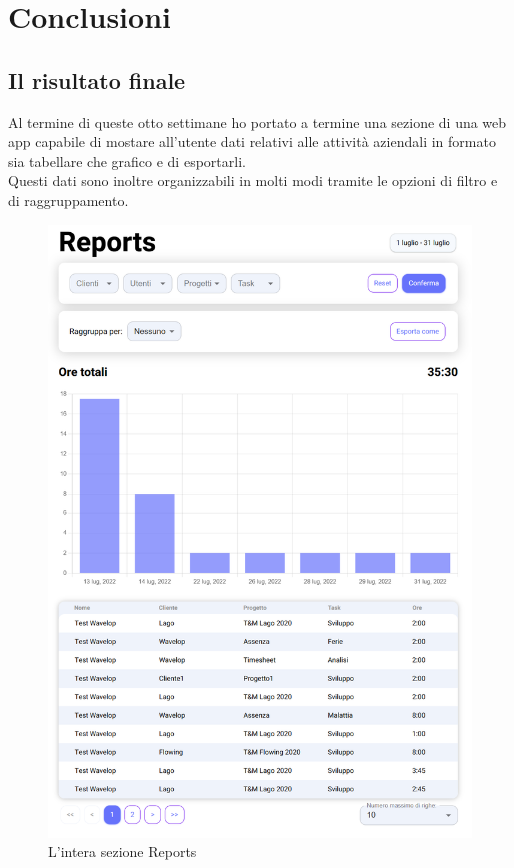 
\chapter{Conclusioni}
\label{cap:conclusioni}

\section{Il risultato finale}
Al termine di queste otto settimane ho portato a termine una sezione di una web app capabile di mostare all'utente dati relativi alle attività aziendali in formato sia tabellare che grafico e di esportarli.\\
Questi dati sono inoltre organizzabili in molti modi tramite le opzioni di filtro e di raggruppamento.\\
\clearpage
\begin{figure}[H]
	\includegraphics[width = \textwidth]{immagini/full reports.png}
	\caption{L'intera sezione Reports}
	\label{fig:report_full}
\end{figure}


